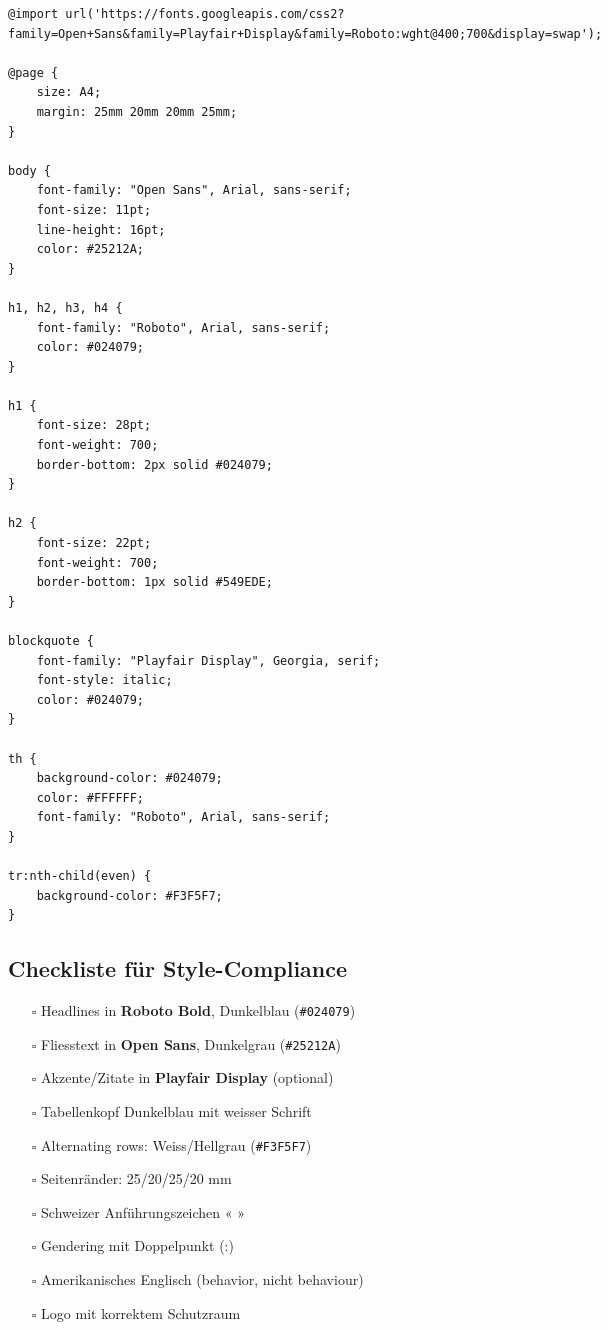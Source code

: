 \begin{verbatim}
@import url('https://fonts.googleapis.com/css2?family=Open+Sans&family=Playfair+Display&family=Roboto:wght@400;700&display=swap');

@page {
    size: A4;
    margin: 25mm 20mm 20mm 25mm;
}

body {
    font-family: "Open Sans", Arial, sans-serif;
    font-size: 11pt;
    line-height: 16pt;
    color: #25212A;
}

h1, h2, h3, h4 {
    font-family: "Roboto", Arial, sans-serif;
    color: #024079;
}

h1 {
    font-size: 28pt;
    font-weight: 700;
    border-bottom: 2px solid #024079;
}

h2 {
    font-size: 22pt;
    font-weight: 700;
    border-bottom: 1px solid #549EDE;
}

blockquote {
    font-family: "Playfair Display", Georgia, serif;
    font-style: italic;
    color: #024079;
}

th {
    background-color: #024079;
    color: #FFFFFF;
    font-family: "Roboto", Arial, sans-serif;
}

tr:nth-child(even) {
    background-color: #F3F5F7;
}
\end{verbatim}

\subsection{Checkliste für Style-Compliance}

\begin{tcolorbox}[colback=green!5!white, colframe=green!75!black, title=Style-Compliance Checkliste]
\begin{itemize}
    \item[$\square$] Headlines in \textbf{Roboto Bold}, Dunkelblau (\texttt{\#024079})
    \item[$\square$] Fliesstext in \textbf{Open Sans}, Dunkelgrau (\texttt{\#25212A})
    \item[$\square$] Akzente/Zitate in \textbf{Playfair Display} (optional)
    \item[$\square$] Tabellenkopf Dunkelblau mit weisser Schrift
    \item[$\square$] Alternating rows: Weiss/Hellgrau (\texttt{\#F3F5F7})
    \item[$\square$] Seitenränder: 25/20/25/20 mm
    \item[$\square$] Schweizer Anführungszeichen « »
    \item[$\square$] Gendering mit Doppelpunkt (:)
    \item[$\square$] Amerikanisches Englisch (behavior, nicht behaviour)
    \item[$\square$] Logo mit korrektem Schutzraum
\end{itemize}
\end{tcolorbox}


